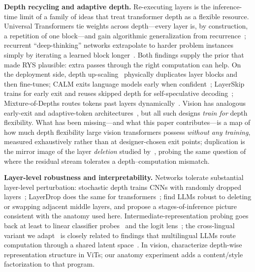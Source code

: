 \documentclass{article}
\begin{document}
\textbf{Depth recycling and adaptive depth.} Re-executing layers is the
inference-time limit of a family of ideas that treat transformer depth as
a flexible resource. Universal Transformers tie weights across
depth---every layer is, by construction, a repetition of one
block---and gain algorithmic generalization from
recurrence~\citep{dehghani2019universal}; recurrent ``deep-thinking''
networks extrapolate to harder problem instances simply by iterating a
learned block longer~\citep{schwarzschild2021can}. Both findings supply
the prior that made RYS plausible: extra passes through the right
computation can help. On the deployment side, depth
up-scaling~\citep{kim2024solar} physically duplicates layer blocks and
then fine-tunes; CALM exits language models early when
confident~\citep{schuster2022confident}; LayerSkip trains for early exit
and reuses skipped depth for self-speculative
decoding~\citep{elhoushi2024layerskip,zhang2024draft}; Mixture-of-Depths
routes tokens past layers dynamically~\citep{raposo2024mixture}. Vision
has analogous early-exit and adaptive-token
architectures~\citep{huang2018multi,yin2022avit}, but all such designs
\emph{train for} depth flexibility. What has been missing---and what this
paper contributes---is a map of how much depth flexibility large vision
transformers possess \emph{without any training}, measured exhaustively rather than at
designer-chosen exit points; duplication is the mirror image of the layer
\emph{deletion} studied by~\citet{lad2024remarkable}, probing the same
question of where the residual stream tolerates a depth--computation
mismatch.

\textbf{Layer-level robustness and interpretability.} Networks tolerate
substantial layer-level perturbation: stochastic depth trains CNNs with
randomly dropped layers~\citep{huang2016deep}; LayerDrop does the same
for transformers~\citep{fan2020reducing}; \citet{lad2024remarkable}
find LLMs robust to deleting or swapping adjacent middle layers, and
propose a stages-of-inference picture consistent with the anatomy used
here. Intermediate-representation probing goes back at least to linear
classifier probes~\citep{alain2017understanding} and the logit
lens~\citep{nostalgebraist2020logitlens}; the cross-lingual variant we
adapt~\citep{hankins2025sapirwhorf} is closely related to findings that
multilingual LLMs route computation through a shared latent
space~\citep{wendler2024llamas}. In vision, \citet{raghu2021vision}
characterize depth-wise representation structure in ViTs; our anatomy
experiment adds a content/style factorization to that program.
\end{document}
